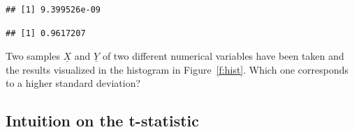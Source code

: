 \begin{knitrout}
\color{fgcolor}\begin{kframe}
\begin{alltt}
 \hlkwb{<-} 
 \hlkwb{<-} 
\hldef{(} \hlopt{-} \hlopt{/} \hlopt{-} \hldef{) )}
\end{alltt}
\begin{verbatim}
## [1] 9.399526e-09
\end{verbatim}
\begin{alltt}
\end{alltt}
\begin{verbatim}
## [1] 0.9617207
\end{verbatim}
\begin{alltt}
\end{alltt}
\end{kframe}
\end{knitrout}


	\begin{ExerciseList}
      		\Exercise Two samples $ \underline X$ and $\underline Y$ of two different numerical variables have been taken and the results visualized in  the histogram in Figure~\ref{f:hist}. Which one corresponds to a higher standard deviation? 
      	\end{ExerciseList}

      	\subsection{Intuition on the t-statistic}

